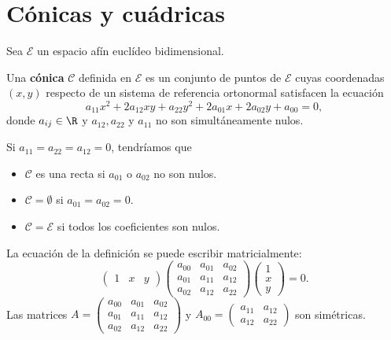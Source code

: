 \section{Cónicas y cuádricas}
Sea $\displaystyle \mathcal{E} $ un espacio afín euclídeo bidimensional. 
\begin{fdefinition}[Cónica]
\normalfont Una \textbf{cónica} $\displaystyle \mathcal{C} $ definida en $\displaystyle \mathcal{E} $ es un conjunto de puntos de $\displaystyle \mathcal{E} $ cuyas coordenadas $\displaystyle \left(x,y\right) $ respecto de un sistema de referencia ortonormal satisfacen la ecuación 
\[ a_{11}x^{2} + 2a_{12}xy +a_{22}y^{2} + 2a_{01}x + 2a_{02}y + a_{00} = 0,\]
donde $\displaystyle a_{ij} \in \R $ y $\displaystyle a_{12}, a_{22} $ y $\displaystyle a_{11} $ no son simultáneamente nulos.
\end{fdefinition}
\begin{observation}
\normalfont Si $\displaystyle a_{11} = a_{22} = a_{12} = 0 $, tendríamos que 
\begin{itemize}
\item $\displaystyle \mathcal{C} $ es una recta si $\displaystyle a_{01} $ o $\displaystyle a_{02} $ no son nulos.
\item $\displaystyle \mathcal{C} = \emptyset $ si $\displaystyle a_{01} = a_{02} = 0 $.
\item $\displaystyle \mathcal{C} = \mathcal{E} $ si todos los coeficientes son nulos.
\end{itemize}
\end{observation}
\begin{observation}
\normalfont La ecuación de la definición se puede escribir matricialmente:
\[\begin{pmatrix} 1 & x & y \end{pmatrix}\begin{pmatrix} a_{00} & a_{01} & a_{02} \\
a_{01} & a_{11} & a_{12} \\
a_{02} & a_{12} & a_{22}\end{pmatrix}\begin{pmatrix} 1 \\ x \\ y \end{pmatrix} = 0.\]
Las matrices $\displaystyle A = \begin{pmatrix} a_{00} & a_{01} & a_{02} \\
a_{01} & a_{11} & a_{12} \\
a_{02} & a_{12} & a_{22}\end{pmatrix} $ y $\displaystyle A_{00} = \begin{pmatrix} a_{11} & a_{12} \\ a_{12} & a_{22} \end{pmatrix} $ son simétricas.
\end{observation}
